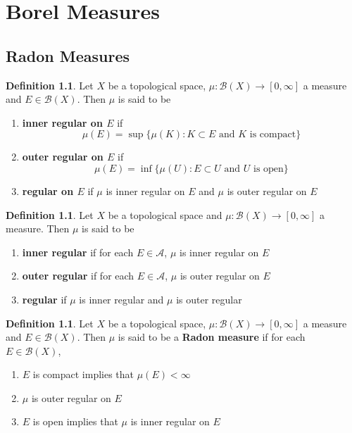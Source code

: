 \documentclass{book}
\theoremstyle{definition}
\newtheorem{defn}[definition]{Definition}
\newcommand{\MA}{\mathcal{A}}
\newcommand{\MB}{\mathcal{B}}
\newcommand{\ld}[1]{\label{defn:#1}}
\DeclareMathOperator*{\0}{\mbf{0}}
\DeclareMathOperator*{\1}{\mbf{1}}
\newcommand{\RG}{[0,\infty]}
\begin{document}
	
	
	

	
	
	
	\newpage
	\chapter{Borel Measures}
	
	\section{Radon Measures}
	
	\begin{defn} \ld{00000} 
	Let $X$ be a topological space, $\mu: \MB(X) \rightarrow \RG$ a measure and $E \in \MB(X)$. Then $\mu$ is said to be 
	\begin{enumerate}
	\item \textbf{inner regular on $E$} if
	$$\mu(E) = \sup \{ \mu(K): K \subset E \text{ and $K$ is compact}\}$$
	\item \textbf{outer regular on $E$} if
	$$\mu(E) = \inf \{ \mu(U): E \subset U \text{ and $U$ is open}\}$$
	\item \textbf{regular on $E$} if $\mu$ is inner regular on $E$ and $\mu$ is outer regular on $E$
	\end{enumerate}
	\end{defn}
	
	\begin{defn} \ld{00000} 
	Let $X$ be a topological space and $\mu: \MB(X) \rightarrow \RG$ a measure. Then $\mu$ is said to be 
	\begin{enumerate}
	\item  \textbf{inner regular} if for each $E \in \MA$, $\mu$ is inner regular on $E$
	\item  \textbf{outer regular} if for each $E \in \MA$, $\mu$ is outer regular on $E$
	\item  \textbf{regular} if $\mu$ is inner regular and $\mu$ is outer regular
	\end{enumerate}
	\end{defn}
	
	\begin{defn} \ld{00000} 
	Let $X$ be a topological space, $\mu: \MB(X) \rightarrow \RG$ a measure and $E \in \MB(X)$. Then $\mu$ is said to be a \textbf{Radon measure} if for each $E \in \MB(X)$, 
	\begin{enumerate}
	\item $E$ is compact implies that $\mu(E) < \infty$
	\item $\mu$ is outer regular on $E$
	\item $E$ is open implies that $\mu$ is inner regular on $E$
	\end{enumerate}
	\end{defn}
\end{document}
